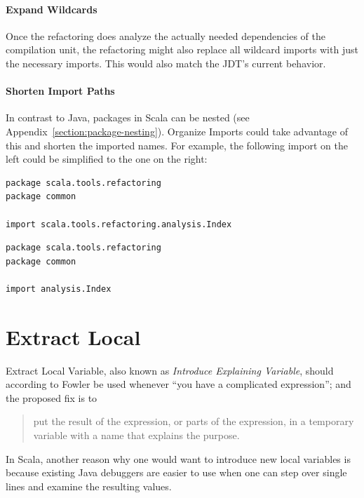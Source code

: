 \documentclass[10pt,a4paper,oneside]{scrreprt}
\begin{document}
\paragraph{Expand Wildcards} Once the refactoring does analyze the actually needed dependencies of the compilation unit, the refactoring might also replace all wildcard imports with just the necessary imports. This would also match the JDT's current behavior.

\paragraph{Shorten Import Paths} In contrast to Java, packages in Scala can be nested (see Appendix~\vref{section:package-nesting}). Organize Imports could take advantage of this and shorten the imported names. For example, the following import on the left could be simplified to the one on the right:

\begin{multicols}{2}
\begin{lstlisting}
package scala.tools.refactoring
package common

import scala.tools.refactoring.analysis.Index
\end{lstlisting}
\needspace{\baselineskip}
\begin{lstlisting}
package scala.tools.refactoring
package common

import analysis.Index
\end{lstlisting}
\end{multicols}

\section{Extract Local}

Extract Local Variable, also known as \textit{Introduce Explaining Variable}, should according to Fowler \cite{FowlerRefactoring} be used whenever ``you have a complicated expression''; and the proposed fix is to 

\begin{quotation}
put the result of the expression, or parts of the expression, in a temporary variable with a name that explains the purpose.
\end{quotation}

In Scala, another reason why one would want to introduce new local variables is because existing Java debuggers are easier to use when one can step over single lines and examine the resulting values.
\end{document}
